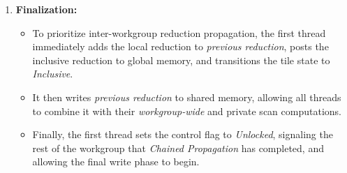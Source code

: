 \documentclass[sigconf,screen]{acmart}
\begin{document}
\begin{enumerate}
  \item \textbf{Finalization:}
        \begin{itemize}
          \item To prioritize inter-workgroup reduction propagation, the first thread immediately adds the local reduction to \emph{previous reduction}, posts the inclusive reduction to global memory, and transitions the tile state to \emph{Inclusive}.
          \item It then writes \emph{previous reduction} to shared memory, allowing all threads to combine it with their \emph{workgroup-wide} and private scan computations.
          \item Finally, the first thread sets the control flag to \emph{Unlocked}, signaling the rest of the workgroup that \emph{Chained Propagation} has completed, and allowing the final write phase to begin.
        \end{itemize}
\end{enumerate}
\end{document}
